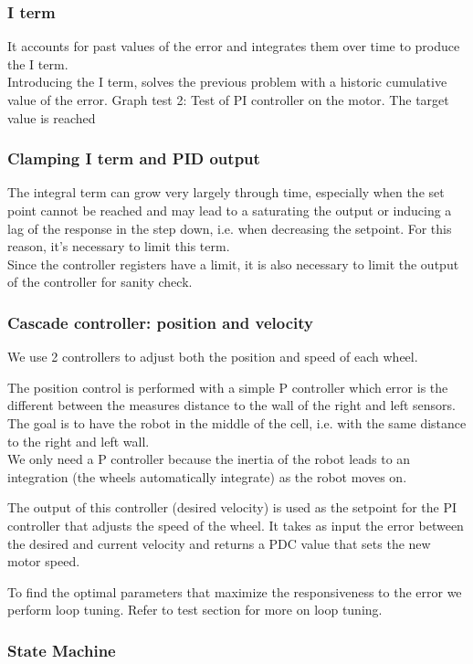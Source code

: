 \subsubsection{I term}

It accounts for past values of the error and integrates them over time to produce the I term. \\
Introducing the I term, solves the previous problem with a historic cumulative value of the error.
Graph test 2: Test of PI controller on the motor. The target value is reached

\subsubsection{Clamping I term and PID output}

The integral term can grow very largely through time, especially when the set point cannot be reached and may lead to a saturating the output or inducing a lag of the response in the step down, i.e. when decreasing the setpoint. For this reason, it’s necessary to limit this term.\\
Since the controller registers have a limit, it is also necessary to limit the output of the controller for sanity check. 

\subsubsection{Cascade controller: position and velocity}

We use 2 controllers to adjust both the position and speed of each wheel. 

The position control is performed with a simple P controller which error is the different between the measures distance to the wall of the right and left sensors. The goal is to have the robot in the middle of the cell, i.e. with the same distance to the right and left wall.\\
We only need a P controller because the inertia of the robot leads to an integration (the wheels automatically integrate) as the robot moves on.

The output of this controller (desired velocity) is used as the setpoint for the PI controller that adjusts the speed of the wheel. It takes as input the error between the desired and current velocity and returns a PDC value that sets the new motor speed.

To find the optimal parameters that maximize the responsiveness to the error we perform loop tuning. Refer to test section for more on loop tuning. 

\subsubsection{State Machine}



